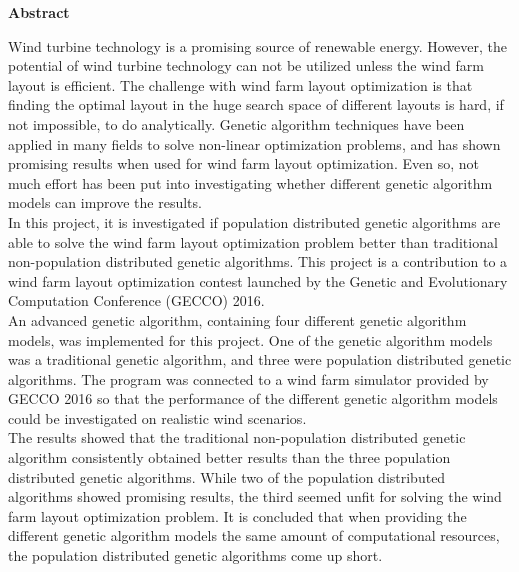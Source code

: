 \begin{center}
\textbf{Abstract}
\end{center}    

\noindent Wind turbine technology is a promising source of renewable energy. However, the potential of wind turbine technology can not be utilized unless the wind farm layout is efficient. The challenge with wind farm layout optimization is that finding the optimal layout in the huge search space of different layouts is hard, if not impossible, to do analytically. Genetic algorithm techniques have been applied in many fields to solve non-linear optimization problems, and has shown promising results when used for wind farm layout optimization. Even so, not much effort has been put into investigating whether different genetic algorithm models can improve the results.\\

\noindent In this project, it is investigated if population distributed genetic algorithms are able to solve the wind farm layout optimization problem better than traditional non-population distributed genetic algorithms. This project is a contribution to a wind farm layout optimization contest launched by the Genetic and Evolutionary Computation Conference (GECCO) 2016.\\

\noindent An advanced genetic algorithm, containing four different genetic algorithm models, was implemented for this project. One of the genetic algorithm models was a traditional genetic algorithm, and three were population distributed genetic algorithms. The program was connected to a wind farm simulator provided by GECCO 2016 so that the performance of the different genetic algorithm models could be investigated on realistic wind scenarios.\\

\noindent The results showed that the traditional non-population distributed genetic algorithm consistently obtained better results than the three population distributed genetic algorithms. While two of the population distributed algorithms showed promising results, the third seemed unfit for solving the wind farm layout optimization problem. It is concluded that when providing the different genetic algorithm models the same amount of computational resources, the population distributed genetic algorithms come up short.\\
 